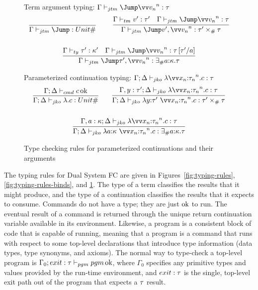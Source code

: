 \documentclass{article}
\begin{document}
\begin{figure}
\centering

 Term argument typing: $\typejmptm{\Gamma}{\vect[n]{\tm_n}}{\ty}$
\begin{gather*}
  \axiom{\typejmptm{\Gamma}{}{\unitjmpty}}
  \qquad
  \infer
  {\typejmptm{\Gamma}{v', \vect[n]{\tm_n}}{\prodjmpty{\ty'}{\ty}}}
  {
    \typetm{\Gamma}{v'}{\ty'}
    &
    \typejmptm{\Gamma}{\vect[n]{\tm_n}}{\ty}
  }
  \\\\
  \infer
  {\typejmptm{\Gamma}{\ty', \vect[n]{\tm_n}}{\existjmpty{\ann a \ki}{\ty}}}
  {
    \typety{\Gamma}{\ty'}{\ki'}
    &
    \typejmptm{\Gamma}{\vect[n]{\tm_n}}{\ty\subst{a}{\ty'}}
  }
\end{gather*}

Parameterized continuation typing:
$\typejmpko{\Gamma}{\Delta}{\fnk{\vect[n]{\ann{x_n}{\ty_n}}}\cmd}{\ty}$
\begin{gather*}
  \infer
  {\typejmpko{\Gamma}{\Delta}{\fnk{}\cmd}{\unitjmpty}}
  {\typecmd{\Gamma}{\Delta}{\cmd}}
  \qquad
  \infer
  {
    \typejmpko
    {\Gamma}{\Delta}
    {\fnk{\ann{y}{\ty'}~\vect[n]{\ann{x_n}{\ty_n}}}\cmd}
    {\prodjmpty{\ty'}{\ty}}
  }
  {
    \typejmpko
    {\Gamma, y:\ty'}{\Delta}
    {\fnk{\vect[n]{\ann{x_n}{\ty_n}}}\cmd}
    {\ty}
  }
  \\\\
  \infer
  {
    \typejmpko
    {\Gamma}{\Delta}
    {\fnk{\ann{a}{\ki}~\vect[n]{\ann{x_n}{\ty_n}}}\cmd}
    {\existjmpty{\ann{a}{\ki}}\ty}
  }
  {
    \typejmpko
    {\Gamma, a:\ki}{\Delta}
    {\fnk{\vect[n]{\ann{x_n}{\ty_n}}}\cmd}
    {\ty}
  }
\end{gather*}

\caption{Type checking rules for parameterized continuations and their arguments}
\label{fig:typing-rules-jumps}
\end{figure}

The typing rules for Dual System FC are given in Figures~\ref{fig:typing-rules},
\ref{fig:typing-rules-binds}, and \ref{fig:typing-rules-jumps}.  The type of a
term classifies the results that it might produce, and the type of a
continuation classifies the results that it expects to consume.  Commands do not
have a type; they are just $\operatorname{ok}$ to run.  The eventual result of a command is
returned through the unique return continuation variable available in its
environment.  Likewise, a program is a consistent block of code that is capable
of running, meaning that a program is a command that runs with respect to some
top-level declarations that introduce type information (data types, type
synonyms, and axioms).  The normal way to type-check a top-level program is
$\Gamma_0; exit:\tau \vdash_{pgm} pgm \operatorname{ok}$, where $\Gamma_0$ specifies any primitive
types and values provided by the run-time environment, and $exit:\tau$ is the
single, top-level exit path out of the program that expects a $\tau$ result.
\end{document}
